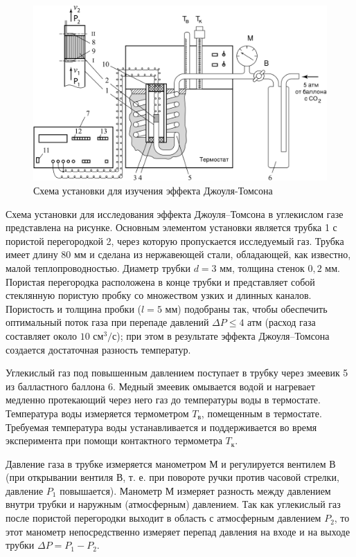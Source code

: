 \documentclass[a4paper, 12pt]{article}
\begin{document}
    \begin{figure}[ht]
        \centering
        \includegraphics[width=0.9\linewidth]{images/ustanovka.png}
        \caption{Схема установки для изучения эффекта Джоуля-Томсона}
        \label{pic1}
    \end{figure}
    
    Схема установки для исследования эффекта Джоуля–Томсона в углекислом газе представлена на рисунке. Основным элементом установки является трубка 1 с пористой перегородкой 2, через которую пропускается исследуемый газ. Трубка имеет длину $80 \text{ мм}$ и сделана из нержавеющей стали, обладающей, как известно, малой теплопроводностью. Диаметр трубки $d = 3 \text{ мм}$, толщина стенок $0,2 \text{ мм}$. Пористая перегородка расположена в конце трубки и представляет собой стеклянную пористую пробку со множеством узких и длинных каналов. Пористость и толщина пробки ($l = 5 \text{ мм}$) подобраны так, чтобы обеспечить оптимальный поток газа при перепаде давлений $\Delta P \leq 4 \text{ атм}$ (расход газа составляет около $10 \text{ см}^3 \text{/с}$); при этом в результате эффекта Джоуля–Томсона создается достаточная разность температур.
    
    Углекислый газ под повышенным давлением поступает в трубку через змеевик 5 из балластного баллона 6. Медный змеевик омывается водой и нагревает медленно протекающий через него газ до температуры воды в термостате. Температура воды измеряется термометром $T_в$, помещенным в термостате. Требуемая температура воды устанавливается и поддерживается во время эксперимента при помощи контактного термометра $T_к$.
    
    Давление газа в трубке измеряется манометром М и регулируется вентилем В (при открывании вентиля В, т. е. при повороте ручки против часовой стрелки, давление $P_1$ повышается). Манометр М измеряет разность между давлением внутри трубки и наружным (атмосферным) давлением. Так как углекислый газ после пористой перегородки выходит в область с атмосферным давлением $P_2$, то этот манометр непосредственно измеряет перепад давления на входе и на выходе трубки $\Delta P = P_1 - P_2$.
    
\end{document}
